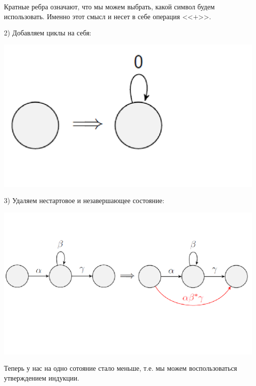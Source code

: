Кратные ребра означают, что мы можем выбрать, какой символ будем использовать. Именно этот смысл и несет в себе операция <<$+$>>.

2) Добавляем циклы на себя:
\begin{minipage}[r]{0.1\linewidth} 
    \includegraphics[width=3.5\linewidth]{images/1_4_6.png}
\end{minipage} 

3) Удаляем нестартовое и незавершающее состояние:

\begin{minipage}[r]{0.1\linewidth} 
    \includegraphics[width=5.5\linewidth]{images/1_4_7.png}
\end{minipage} 
\newline Теперь у нас на одно сотояние стало меньше, т.е. мы можем воспользоваться утверждением индукции.
\EndProof
